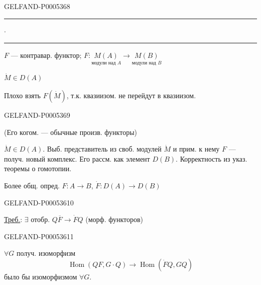 \begin{GelfandAdjacentEvidence}{GELFAND-P000536}{8}


\noindent\makebox[.64\linewidth]{\dotfill}\par
\hfill\rule{1.4cm}{.35pt}\enspace\(\cdot\)\enspace\rule{1.4cm}{.35pt}\par

$F$ — контравар. функтор; \(
F:\underset{\text{модули над }A}{M(A)}
\to\underset{\text{модули над }B}{M(B)}
\)

\(\dot M\in D(A)\)

Плохо взять \(F(\dot M)\), т.к. квазиизом. не перейдут в квазиизом.

\end{GelfandAdjacentEvidence}
\begin{GelfandAdjacentEvidence}{GELFAND-P000536}{9}

(Его когом. — обычные произв. функторы)

\(\dot M\in D(A)\). Выб. представитель из своб. модулей \(\dot M\) и прим. к нему $F$ — получ. новый комплекс.
Его рассм. как элемент \(D(B)\). Корректность из указ. теоремы о гомотопии.

Более общ. опред. \(F:A\to B\), \(\dot F:D(A)\to D(B)\)
\end{GelfandAdjacentEvidence}
\begin{GelfandAdjacentEvidence}{GELFAND-P000536}{10}


\uline{Треб.}: \(\exists\) отобр. \(Q\overline F\to\dot FQ\)
(морф. функторов)
\end{GelfandAdjacentEvidence}
\begin{GelfandAdjacentEvidence}{GELFAND-P000536}{11}


\(\forall G\) получ. изоморфизм
\[
\operatorname{Hom}(QF,G\cdot Q)\longrightarrow\operatorname{Hom}(\dot FQ,GQ)
\]
было бы изоморфизмом \(\forall G\).
\end{GelfandAdjacentEvidence}


